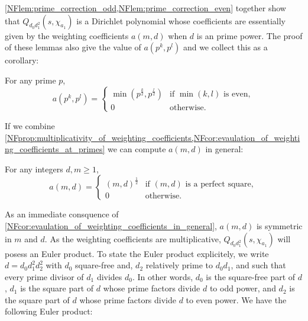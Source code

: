     \cref{NFlem:prime_correction_odd,NFlem:prime_correction_even} together show that $Q_{d_{0}d_{1}^{2}}(s,\chi_{a_{1}})$ is a Dirichlet polynomial whose coefficients are essentially given by the weighting coefficients $a(m,d)$ when $d$ is an prime power. The proof of these lemmas also give the value of $a(p^{k},p^{l})$ and we collect this as a corollary:

    \begin{corollary}\label{NFcor:evaulation_of_weighting_coefficients_at_primes}
        For any prime $p$,
        \[
            a(p^{k},p^{l}) = \begin{cases} \min\left(p^{\frac{k}{2}},p^{\frac{l}{2}}\right) & \text{if $\min(k,l)$ is even}, \\ 0 & \text{otherwise}. \end{cases}
        \]
    \end{corollary}

    If we combine \cref{NFprop:multiplicativity_of_weighting_coefficients,NFcor:evaulation_of_weighting_coefficients_at_primes} we can compute $a(m,d)$ in general:

    \begin{corollary}\label{NFcor:evaulation_of_weighting_coefficients_in_general}
        For any integers $d,m \ge 1$,
        \[
            a(m,d) = \begin{cases} (m,d)^{\frac{1}{2}} & \text{if $(m,d)$ is a perfect square}, \\ 0 & \text{otherwise}. \end{cases}
         \]
    \end{corollary}
    
    As an immediate consquence of \cref{NFcor:evaulation_of_weighting_coefficients_in_general}, $a(m,d)$ is symmetric in $m$ and $d$. As the weighting coefficients are multiplicative, $Q_{d_{0}d_{1}^{2}}(s,\chi_{a_{1}})$ will posess an Euler product. To state the Euler product explicitely, we write $d = d_{0}d_{1}^{2}d_{2}^{2}$ with $d_{0}$ square-free and, $d_{2}$ relatively prime to $d_{0}d_{1}$, and such that every prime divisor of $d_{1}$ divides $d_{0}$. In other words, $d_{0}$ is the square-free part of $d$, $d_{1}$ is the square part of $d$ whose prime factors divide $d$ to odd power, and $d_{2}$ is the square part of $d$ whose prime factors divide $d$ to even power. We have the following Euler product:

